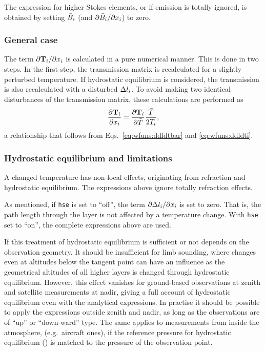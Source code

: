 The expression for higher Stokes elements, or if emission is totally ignored,
is obtained by setting $\bar{B}_i$
(and $\partial\bar{B}_i/\partial x_{i}$) to zero.


\subsubsection{General case}
%
The term $\partial\mathbf{T}_{i}/\partial x_{i}$ is calculated in a pure
numerical manner. This is done in two steps. In the first step, the
transmission matrix is recalculated for a slightly perturbed temperature. If
hydrostatic equilibrium is considered, the transmission is also recalculated
with a disturbed $\Delta l_{i}$. To avoid making two identical disturbances of
the transmission matrix, these calculations are performed as
\begin{displaymath}
  \frac{\partial\mathbf{T}_{i}}{\partial x_{i}} = 
  \frac{\partial\mathbf{T}_{i}}{\partial\bar{T}}\frac{\bar{T}}{2T_{i}},
\end{displaymath}
a relationship that follows from Eqs.~\ref{eq:wfuns:ddldtbar} and \ref{eq:wfuns:ddldti}.



\subsubsection{Hydrostatic equilibrium and limitations}
%
A changed temperature has non-local effects, originating from refraction and
hydrostatic equilibrium. The expressions above ignore totally refraction
effects. 

As  mentioned,  if \verb|hse|  is  set  to  ``off'',  the term  $\partial  \Delta
l_{i}/\partial x_{i}$  is set  to  zero. That  is,  the path  length
through the layer is not affected  by a temperature change. With \verb|hse| set
to ``on'', the complete expressions above are used.

If this treatment of hydrostatic equilibrium is sufficient or not depends on
the observation geometry. It should be insufficient for limb sounding,
where changes even at altitudes below the tangent point can have an influence
as the geometrical altitudes of all higher layers is changed through
hydrostatic equilibrium.  However, this effect vanishes for
ground-based observations at zenith and satellite measurements at nadir, giving
a full account of hydrostatic equilibrium even with the analytical expressions.
In practise it should be possible to apply the expressions outside zenith and
nadir, as long as the observations are of ``up'' or ``down-ward'' type. The
same applies to measurements from inside the atmosphere, (e.g.\ aircraft ones),
if the reference pressure for hydrostatic equilibrium () is
matched to the pressure of the observation point.





